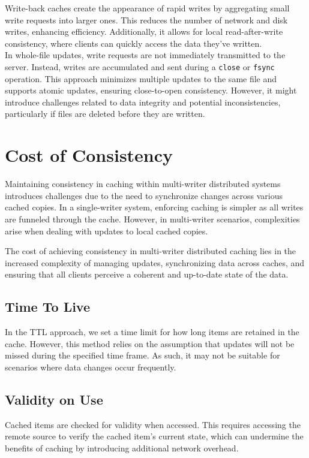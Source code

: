 \documentclass{report}
\newcommand{\asideBegin}[1]{\begin{tcolorbox}[colback=orange!5!white,colframe=black!75!orange,title={Aside:
      #1}]}
\newcommand{\asideEnd}{\end{tcolorbox}}
\begin{document}
\asideBegin{Caching}
Write-back caches create the appearance of rapid writes by aggregating small write requests into
larger ones. This reduces the number of network and disk writes, enhancing efficiency. Additionally,
it allows for local read-after-write consistency, where clients can quickly access the data they've
written. \\

In whole-file updates, write requests are not immediately transmitted to the server. Instead, writes
are accumulated and sent during a \texttt{close} or \texttt{fsync} operation. This approach
minimizes multiple updates to the same file and supports atomic updates, ensuring close-to-open
consistency. However, it might introduce challenges related to data integrity and potential
inconsistencies, particularly if files are deleted before they are written.
\asideEnd


\section{Cost of Consistency}
Maintaining consistency in caching within multi-writer distributed systems introduces challenges due
to the need to synchronize changes across various cached copies. In a single-writer system,
enforcing caching is simpler as all writes are funneled through the cache. However, in multi-writer
scenarios, complexities arise when dealing with updates to local cached copies. 

The cost of achieving consistency in multi-writer distributed caching lies in the increased
complexity of managing updates, synchronizing data across caches, and ensuring that all clients
perceive a coherent and up-to-date state of the data.


\subsection{Time To Live}
In the TTL approach, we set a time limit for how long items are retained in the cache. However, this
method relies on the assumption that updates will not be missed during the specified time frame. As
such, it may not be suitable for scenarios where data changes occur frequently.


\subsection{Validity on Use}
Cached items are checked for validity when accessed. This requires accessing the remote source to
verify the cached item's current state, which can undermine the benefits of caching by introducing
additional network overhead. 
\end{document}
